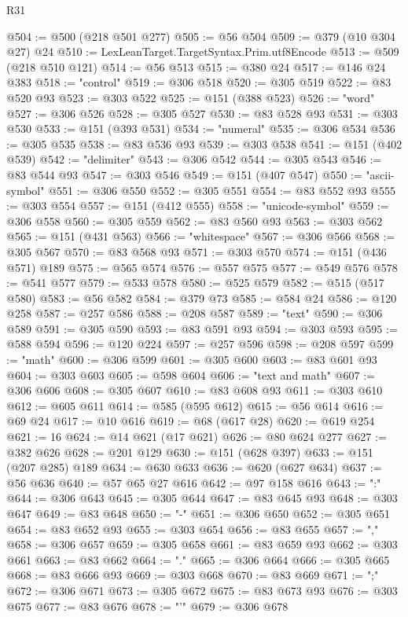 \begin{lexlean}{R31}
\begin{coremodule}
@504 := @500 (@218 @501 @277)
@505 := @56 @504
@509 := @379 (@10 @304 @27) @24
@510 := LexLeanTarget.TargetSyntax.Prim.utf8Encode
@513 := @509 (@218 @510 @121)
@514 := @56 @513
@515 := @380 @24
@517 := @146 @24 @383
@518 := "control"
@519 := @306 @518
@520 := @305 @519
@522 := @83 @520 @93
@523 := @303 @522
@525 := @151 (@388 @523)
@526 := "word"
@527 := @306 @526
@528 := @305 @527
@530 := @83 @528 @93
@531 := @303 @530
@533 := @151 (@393 @531)
@534 := "numeral"
@535 := @306 @534
@536 := @305 @535
@538 := @83 @536 @93
@539 := @303 @538
@541 := @151 (@402 @539)
@542 := "delimiter"
@543 := @306 @542
@544 := @305 @543
@546 := @83 @544 @93
@547 := @303 @546
@549 := @151 (@407 @547)
@550 := "ascii-symbol"
@551 := @306 @550
@552 := @305 @551
@554 := @83 @552 @93
@555 := @303 @554
@557 := @151 (@412 @555)
@558 := "unicode-symbol"
@559 := @306 @558
@560 := @305 @559
@562 := @83 @560 @93
@563 := @303 @562
@565 := @151 (@431 @563)
@566 := "whitespace"
@567 := @306 @566
@568 := @305 @567
@570 := @83 @568 @93
@571 := @303 @570
@574 := @151 (@436 @571) @189
@575 := @565 @574
@576 := @557 @575
@577 := @549 @576
@578 := @541 @577
@579 := @533 @578
@580 := @525 @579
@582 := @515 (@517 @580)
@583 := @56 @582
@584 := @379 @73
@585 := @584 @24
@586 := @120 @258
@587 := @257 @586
@588 := @208 @587
@589 := "text"
@590 := @306 @589
@591 := @305 @590
@593 := @83 @591 @93
@594 := @303 @593
@595 := @588 @594
@596 := @120 @224
@597 := @257 @596
@598 := @208 @597
@599 := "math"
@600 := @306 @599
@601 := @305 @600
@603 := @83 @601 @93
@604 := @303 @603
@605 := @598 @604
@606 := "text and math"
@607 := @306 @606
@608 := @305 @607
@610 := @83 @608 @93
@611 := @303 @610
@612 := @605 @611
@614 := @585 (@595 @612)
@615 := @56 @614
@616 := @69 @24
@617 := @10 @616
@619 := @68 (@617 @28)
@620 := @619 @254
@621 := 16
@624 := @14 @621 (@17 @621)
@626 := @80 @624 @277
@627 := @382 @626
@628 := @201 @129
@630 := @151 (@628 @397)
@633 := @151 (@207 @285) @189
@634 := @630 @633
@636 := @620 (@627 @634)
@637 := @56 @636
@640 := @57 @65 @27 @616
@642 := @97 @158 @616
@643 := ":"
@644 := @306 @643
@645 := @305 @644
@647 := @83 @645 @93
@648 := @303 @647
@649 := @83 @648
@650 := "-"
@651 := @306 @650
@652 := @305 @651
@654 := @83 @652 @93
@655 := @303 @654
@656 := @83 @655
@657 := ","
@658 := @306 @657
@659 := @305 @658
@661 := @83 @659 @93
@662 := @303 @661
@663 := @83 @662
@664 := "."
@665 := @306 @664
@666 := @305 @665
@668 := @83 @666 @93
@669 := @303 @668
@670 := @83 @669
@671 := ";"
@672 := @306 @671
@673 := @305 @672
@675 := @83 @673 @93
@676 := @303 @675
@677 := @83 @676
@678 := "'"
@679 := @306 @678

\end{coremodule}
\end{lexlean}
